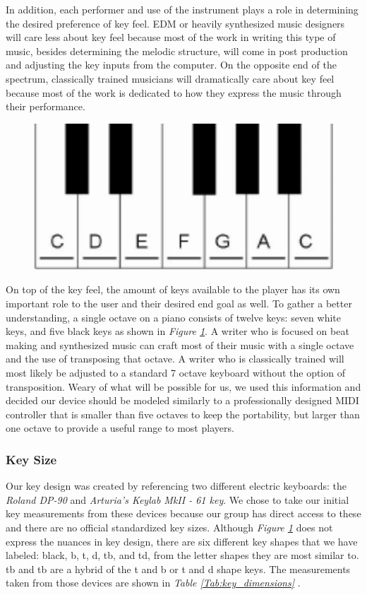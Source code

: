 In addition, each performer and use of the instrument plays a role in determining the desired preference of key feel. EDM or heavily synthesized music designers will care less about key feel because most of the work in writing this type of music, besides determining the melodic structure, will come in post production and adjusting the key inputs from the computer. On the opposite end of the spectrum, classically trained musicians will dramatically care about key feel because most of the work is dedicated to how they express the music through their performance.

\begin{figure}[h!]
  \centering
  \includegraphics[width=0.5\linewidth]{image/Octave.png}
  \caption{}
  \label{fig:octave}
\end{figure}

On top of the key feel, the amount of keys available to the player has its own important role to the user and their desired end goal as well. To gather a better understanding, a single octave on a piano consists of twelve keys: seven white keys, and five black keys as shown in \textit{Figure \ref{fig:octave}}. A writer who is focused on beat making and synthesized music can craft most of their music with a single octave and the use of transposing that octave. A writer who is classically trained will most likely be adjusted to a standard 7 octave keyboard without the option of transposition. Weary of what will be possible for us, we used this information and decided our device should be modeled similarly to a professionally designed MIDI controller that is smaller than five octaves to keep the portability, but larger than one octave to provide a useful range to most players.

\subsubsection{Key Size}
Our key design was created by referencing two different electric keyboards: the \textit{Roland DP-90} and \textit{Arturia’s Keylab MkII - 61 key}. We chose to take our initial key measurements from these devices because our group has direct access to these and there are no official standardized key sizes. Although \textit{Figure \ref{fig:octave}} does not express the nuances in key design, there are six different key shapes that we have labeled: black, b, t, d, tb, and td, from the letter shapes they are most similar to. tb and tb are a hybrid of the t and b or t and d shape keys. The measurements taken from those devices are shown in \textit{Table \ref{Tab:key_dimensions}} .

